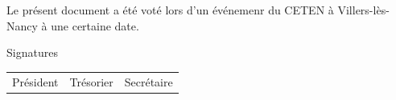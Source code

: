 \documentclass{article} %
\begin{document}
\vfill
\begin{center}
	{\large\light Le présent document a été voté lors d'un événemenr du CETEN à
	Villers-lès-Nancy à une certaine date.}
\end{center}
\vfill
Signatures\par
\vspace{0.5cm}
\begin{tabular*}{\textwidth}{@{\extracolsep{\fill}}ccc}
	Président & Trésorier & Secrétaire
\end{tabular*}
\vspace{3cm}
\end{document}
